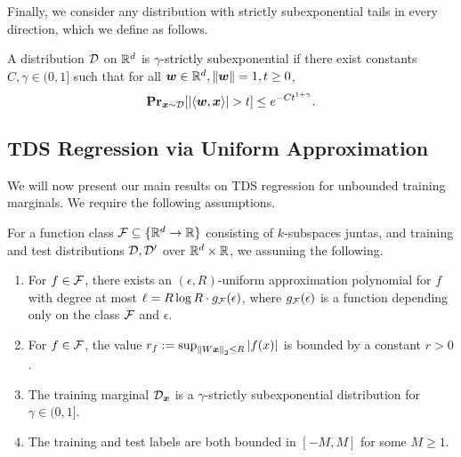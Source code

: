 \documentclass[11pt]{article} %
\numberwithin{equation}{section}
\begin{document}
Finally, we consider any distribution with strictly subexponential tails in every direction, which we define as follows.

\begin{definition}
A distribution ${\mathcal{D}}$ on $\mathbb{R}^d$ is $\gamma$-strictly subexponential if there exist constants $C, \gamma \in (0, 1]$ such that for all ${\bm{w}} \in \mathbb{R}^d, \left\| {\bm{w}} \right\| = 1, t \ge 0$,
\[
\mathbf{Pr}_{{\bm{x}} \sim {\mathcal{D}}}[|\langle {\bm{w}}, {\bm{x}}\rangle| > t] \le e^{-Ct^{1+\gamma}}.
\] 
\end{definition}

\subsection{TDS Regression via Uniform Approximation}\label{section:tds-via-uniform}

We will now present our main results on TDS regression for unbounded training marginals. We require the following assumptions.

\begin{assumption}\label{assumption:unbounded-main}
    For a function class ${\mathcal{F}}\subseteq\{\mathbb{R}^d\to \mathbb{R}\}$ consisting of $k$-subspaces juntas, and training and test distributions ${\mathcal{D}}, {\mathcal{D}}'$ over $\mathbb{R}^d \times \mathbb{R}$, we assuming the following.
    \begin{enumerate}
        \item For $f \in {\mathcal{F}}$, there exists an $(\epsilon, R)$-uniform approximation polynomial for $f$ with degree at most $\ell = R\log R \cdot g_{\mathcal{F}}(\epsilon)$, where $g_{\mathcal{F}}(\epsilon)$ is a function depending only on the class ${\mathcal{F}}$ and $\epsilon$.
        \item For $f \in {\mathcal{F}}$, the value $r_f := \sup_{\left\| W{\bm{x}} \right\|_2 \le R}|f(x)|$ is bounded by a constant $r > 0$.
        \item The training marginal ${\mathcal{D}}_{{\bm{x}}}$ is a $\gamma$-strictly subexponential distribution for $\gamma \in (0,1]$.
        \item The training and test labels are both bounded in $[-M, M]$ for some $M \ge 1$.
    \end{enumerate}
\end{assumption}
\end{document}
